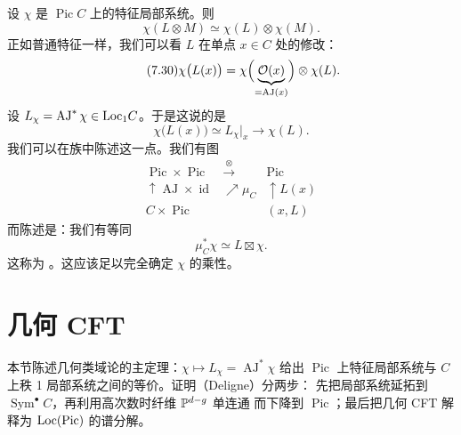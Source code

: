 设 $\chi$ 是 $\operatorname{Pic}C$ 上的特征局部系统。则
\begin{equation}\tag{7.29}\label{eq:7.29}
\chi(L\otimes M)\simeq\chi(L)\otimes\chi(M).
\end{equation}
正如普通特征一样，我们可以看 $L$ 在单点 $x\in C$ 处的修改：
\begin{equation}\tag{7.30}\label{eq:7.30}
\chi\bigl(L(x)\bigr)
=\chi\Bigl(\underbrace{\mathcal{O}(x)}_{=\operatorname{AJ}(x)}\Bigr)\otimes\chi(L).
\end{equation}
设 $L_{\chi}=\operatorname{AJ}^*\chi\in\mathrm{Loc}_1 C$。于是这说的是
\begin{equation}\tag{7.31}\label{eq:7.31}
\chi\bigl(L(x)\bigr)\simeq L_{\chi}|_x\to\chi(L).
\end{equation}
我们可以在族中陈述这一点。我们有图
\begin{equation}\tag{7.32}\label{eq:7.32}
\begin{array}{ccc}
\operatorname{Pic}\times\operatorname{Pic} & \xrightarrow{\ \otimes\ } & \operatorname{Pic}\\[2pt]
\uparrow{\scriptstyle \operatorname{AJ}\times\operatorname{id}}
& \nearrow{\scriptstyle \mu_C}
& \uparrow{\scriptstyle L(x)}\\[2pt]
C\times\operatorname{Pic} & & (x,L)
\end{array}
\end{equation}
而陈述是：我们有等同
\begin{equation}\tag{7.33}\label{eq:7.33}
\mu_C^*\chi\simeq L\boxtimes\chi .
\end{equation}
这称为 。这应该足以完全确定 $\chi$ 的乘性。


\section{几何 CFT}

\begin{sectionkey}
本节陈述几何类域论的主定理：$\chi\mapsto L_\chi=\operatorname{AJ}^*\chi$ 给出
$\operatorname{Pic}$ 上特征局部系统与 $C$ 上秩 1 局部系统之间的等价。证明（Deligne）分两步：
先把局部系统延拓到 $\operatorname{Sym}^\bullet C$，再利用高次数时纤维 $\mathbb{P}^{d-g}$ 单连通
而下降到 $\operatorname{Pic}$；最后把几何 CFT 解释为 $\mathrm{Loc}(\operatorname{Pic})$ 的谱分解。
\end{sectionkey}


